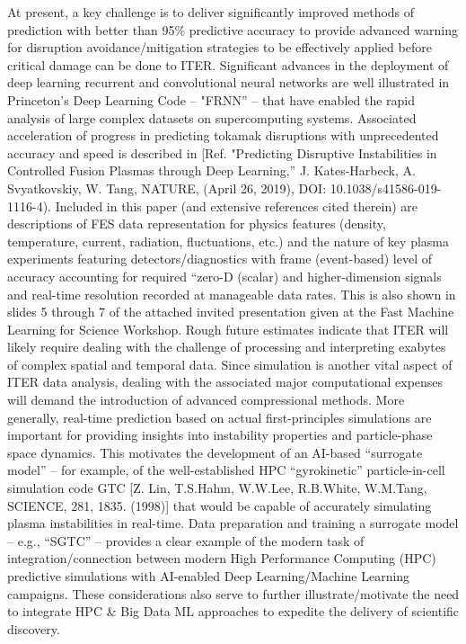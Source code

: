 At present, a key challenge is to deliver significantly improved methods of prediction with better than 95\% predictive accuracy to provide advanced warning for disruption avoidance/mitigation strategies to be effectively applied before critical damage can be done to ITER.  Significant advances in the deployment of deep learning recurrent and convolutional neural networks are well illustrated in Princeton’s Deep Learning Code -- "FRNN” – that have enabled the rapid analysis of large complex datasets on supercomputing systems.  Associated acceleration of progress in predicting tokamak disruptions with unprecedented accuracy and speed is described in [Ref. "Predicting Disruptive Instabilities in Controlled Fusion Plasmas through Deep Learning,” J. Kates-Harbeck, A. Svyatkovskiy, W. Tang, NATURE, (April 26, 2019), DOI: 10.1038/s41586-019-1116-4).  Included in this paper (and extensive references cited therein) are descriptions of FES data representation for physics features (density, temperature, current, radiation, fluctuations, etc.) and the nature of key plasma experiments featuring detectors/diagnostics with frame (event-based) level of accuracy accounting for required “zero-D (scalar) and higher-dimension signals and real-time resolution recorded at manageable data rates.  This is also shown in slides 5 through 7 of the attached invited presentation given at the Fast Machine Learning for Science Workshop.  Rough future estimates indicate that ITER will likely require dealing with the challenge of processing and interpreting exabytes of complex spatial and temporal data. 
Since simulation is another vital aspect of ITER data analysis, dealing with the associated major computational expenses will demand the introduction of advanced compressional methods.  More generally, real-time prediction based on actual first-principles simulations are important for providing insights into instability properties and particle-phase space dynamics. This motivates the development of an AI-based “surrogate model” -- for example, of the well-established HPC “gyrokinetic” particle-in-cell simulation code GTC [Z. Lin, T.S.Hahm, W.W.Lee, R.B.White, W.M.Tang, SCIENCE, 281, 1835. (1998)] that would be capable of accurately simulating plasma instabilities in real-time.  Data preparation and training a surrogate model – e.g., “SGTC” -- provides a clear example of the modern task of integration/connection between modern High Performance Computing (HPC) predictive simulations with AI-enabled Deep Learning/Machine Learning campaigns.  These considerations also serve to further illustrate/motivate the need to integrate HPC \& Big Data ML approaches to expedite the delivery of scientific discovery.

